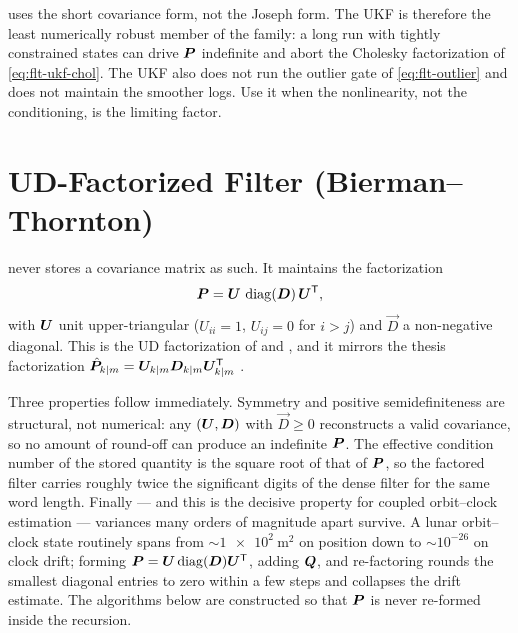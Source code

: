 \begin{lupntwarning}
 uses the short covariance form, not the Joseph form.
The UKF is therefore the least numerically robust member of the family: a long
run with tightly constrained states can drive $\bm{P}$ indefinite and abort
the Cholesky factorization of \cref{eq:flt-ukf-chol}. The UKF also does not run
the outlier gate of \cref{eq:flt-outlier} and does not maintain the smoother
logs. Use it when the nonlinearity, not the conditioning, is the limiting
factor.
\end{lupntwarning}

\section{UD-Factorized Filter (Bierman--Thornton)}
\label{sec:flt-udu}

 never stores a covariance matrix as such. It maintains the
factorization
\begin{equation}
  \label{eq:flt-udu-fact}
  \bm{P} = \bm{U}\,\operatorname{diag}(\bm{D})\,\bm{U}^{\mathsf{T}} ,
\end{equation}
with $\bm{U}$ unit upper-triangular ($U_{ii} = 1$, $U_{ij} = 0$ for $i > j$)
and $\vec{D}$ a non-negative diagonal. This is the UD factorization of
\citet{bierman1977} and \citet{thornton1980}, and it mirrors the thesis
factorization
$\hat{\bm{P}}_{k|m} = \bm{U}_{k|m}\bm{D}_{k|m}\bm{U}_{k|m}^{\mathsf{T}}$
\citep[Ch.~6.2.1, Eq.~6.17, Algorithm~1]{iiyama2026thesis}.

Three properties follow immediately. Symmetry and positive semidefiniteness are
structural, not numerical: any $(\bm{U}, \bm{D})$ with $\vec{D} \geq 0$
reconstructs a valid covariance, so no amount of round-off can produce an
indefinite $\bm{P}$. The effective condition number of the stored quantity is
the square root of that of $\bm{P}$, so the factored filter carries roughly
twice the significant digits of the dense filter for the same word length.
Finally --- and this is the decisive property for coupled orbit--clock
estimation --- variances many orders of magnitude apart survive. A lunar
orbit--clock state routinely spans from $\sim\!\SI{1e2}{\meter\squared}$ on
position down to $\sim\!10^{-26}$ on clock drift; forming
$\bm{P} = \bm{U}\operatorname{diag}(\bm{D})\bm{U}^{\mathsf{T}}$, adding $\bm{Q}$, and
re-factoring rounds the smallest diagonal entries to zero within a few steps
and collapses the drift estimate. The algorithms below are constructed so that
$\bm{P}$ is never re-formed inside the recursion.

